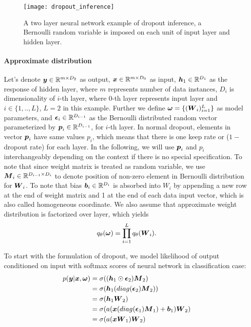 \begin{figure}[h!]
	\begin{center}
		\texttt{[image: dropout\_inference]}
		\caption{A two layer neural network example of dropout inference, a Bernoulli random variable is imposed on each unit of input layer and hidden layer.}		
		\label{fig:dropout_inference}
	\end{center}
\end{figure}

\newpage
\paragraph{Approximate distribution}
Let's denote $\boldsymbol y\in \mathbb R ^{m \times D_{2}}$ as output, $\boldsymbol x \in \mathbb R^{m \times D_{0}}$ as input, $\boldsymbol h_{1} \in \mathbb R^{D_{1}}$ as the response of hidden layer, where $m$ represents number of data instances, $D_{i}$ is dimensionality of $i$-th layer, where $0$-th layer represents input layer and $i \in \{1,..,L\}$, $L=2$ in this example. Further we define $\boldsymbol \omega = \{ (\boldsymbol W_{i})_{i=1}^{L}  \}$ as model parameters, and $\boldsymbol \epsilon_{i} \in \mathbb R^{D_{i-1}}$ as the Bernoulli distributed random vector parameterized by $\boldsymbol p_{i} \in \mathbb R^{D_{i-1}}$, for $i$-th layer. In normal dropout, elements in vector $\boldsymbol p_{i}$ have same values $p_{i}$, which means that there is one keep rate or ($1-$dropout rate) for each layer. In the following, we will use $\boldsymbol p_{i}$ and $p_{i}$ interchangeably depending on the context if there is no special specification. To note that since weight matrix is treated as random variable, we use $\boldsymbol M_{i} \in \mathbb R^{D_{i-1} \times D_{i}}$ to denote position of non-zero element in Bernoulli distribution for $\boldsymbol W_{i}$. To note that bias $\boldsymbol b_{i} \in \mathbb R^{D_{i}}$ is absorbed into $W_{i}$ by appending a new row at the end of weight matrix and 1 at the end of each data input vector, which is also called homogeneous coordinate. We also assume that approximate weight distribution is factorized over layer, which yields
\[
q_{\theta}(\boldsymbol \omega) = \prod_{i=1}^{L}q_{\theta}(\boldsymbol W_{i}). 
\]

To start with the formulation of dropout, we model likelihood of output conditioned on input with softmax scores of neural network in classification case:
\begin{equation}
	\begin{aligned} \label{dropout_form}
	p(\boldsymbol y| \boldsymbol x, \boldsymbol \omega) & = \sigma((\boldsymbol h_{1} \odot \boldsymbol \epsilon_{2}) \boldsymbol M_{2})\\
		   & = \sigma(\boldsymbol h_{1} (diag(\boldsymbol \epsilon_{2}) \boldsymbol M_{2})) \\
		   & = \sigma(\boldsymbol h_{1} \boldsymbol W_{2}) \\
		   & = \sigma(a(\boldsymbol x (diag(\boldsymbol \epsilon_{1}) \boldsymbol M_{1})+ \boldsymbol b_{1}) \boldsymbol W_{2}) \\
		   & = \sigma(a(\boldsymbol x \boldsymbol W_{1})\boldsymbol W_{2})
	\end{aligned}
\end{equation}

